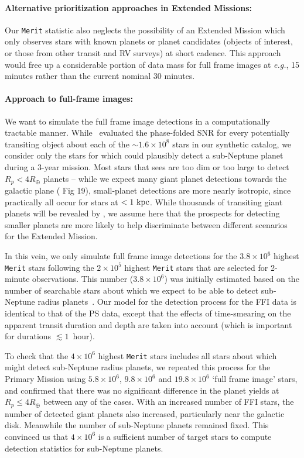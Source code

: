 \paragraph{Alternative prioritization approaches in Extended Missions:}
Our \texttt{Merit} statistic also neglects the possibility of an Extended
Mission which only observes stars with known planets or planet
candidates (\tesss objects of interest, or those from other transit
and RV surveys) at short cadence.  This approach would free up a
considerable portion of \tesss data mass for full frame images at
\textit{e.g.}, 15 minutes rather than the current nominal 30 minutes.

\paragraph{Approach to full-frame images:}
\label{sec:FFI_simulation}
We want to simulate the full frame image detections in a
computationally tractable manner.  While~
evaluated the phase-folded SNR for every potentially transiting object
about each of the $\sim\!1.6\times10^8$ stars in our synthetic catalog,
we consider only the stars for which \tess could plausibly detect a
sub-Neptune planet during a 3-year mission.  Most stars that
\tess sees are too dim or too large to detect $R_p<4R_\oplus$ planets
-- while we expect many giant planet detections towards the galactic
plane ( Fig 19), small-planet detections are
more nearly isotropic, since practically all occur for stars at
$<1\rm\ kpc$.  While thousands of transiting giant planets will be revealed by \tess,
we assume here that the prospects for detecting smaller planets are more likely
to help discriminate between different scenarios for the Extended Mission.

In this vein, we only simulate full frame image detections for the
$3.8\times10^6$ highest \texttt{Merit} stars following the
$2\times10^5$ highest \texttt{Merit} stars that are selected for 2-minute observations.
This number ($3.8\times10^6$) was initially estimated based
on the number of searchable stars about which we expect \tess to be
able to detect sub-Neptune radius
planets~\citep{winn_searchable_2013}. Our model for the detection process for the FFI data is 
identical to that of the PS data, except that the effects of time-smearing on
the apparent transit duration and depth are taken into account (which is
important for durations $\lesssim 1$~hour).

To check that the $4\times10^6$ highest \texttt{Merit} stars includes 
all stars about which \tess might detect sub-Neptune radius planets, 
we repeated this process for the Primary Mission using $5.8\times10^6$,
$9.8\times10^6$ and $19.8\times10^6$ `full frame image' stars, and
confirmed that there was no significant difference in the planet
yields at $R_p\le4R_\oplus$ between any of the cases.
With an increased number of FFI stars, the number of detected giant planets also increased,
particularly near the galactic
disk.  Meanwhile the number of sub-Neptune planets remained
fixed. This convinced us that $4\times10^6$ is a sufficient
number of target stars to compute detection statistics for sub-Neptune planets.
